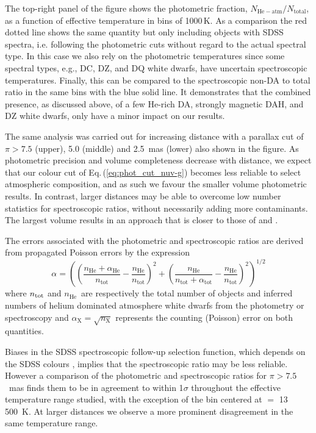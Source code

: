 \documentclass[a4paper,fleqn,usenatbib]{mnras}
\newcommand{\nHe}{$n_{\mathrm{He}}$}
\begin{document}
The top-right panel of the figure shows the photometric fraction, $N_{\mathrm{He-atm}}/N_{\mathrm{total}}$, as a function of effective temperature in bins of 1000\,K. As a comparison the red dotted line shows the same quantity but only including objects with SDSS spectra, i.e. following the photometric cuts without regard to the actual spectral type. In this case we also rely on the photometric temperatures since some spectral types, e.g., DC, DZ, and DQ white dwarfs, have uncertain spectroscopic temperatures. Finally, this can be compared to the spectroscopic non-DA to total ratio in the same bins with the blue solid line. It demonstrates that the combined presence, as discussed above, of a few He-rich DA, strongly magnetic DAH, and DZ white dwarfs, only have a minor impact on our results.

The same analysis was carried out for increasing distance with a parallax cut of $\pi>7.5$ (upper), 5.0 (middle) and 2.5~mas (lower) also shown in the figure. As photometric precision and volume completeness decrease with distance, we expect that our colour cut of Eq.\,(\ref{eq:phot_cut_nuv-g}) becomes less reliable to select atmospheric composition, and as such we favour the smaller volume photometric results. In contrast, larger distances may be able to overcome low number statistics for spectroscopic ratios, without necessarily adding more contaminants. The largest volume results in an approach that is closer to those of \citet{genest-Beaulieu19} and \citet{ourique19}.

The errors associated with the photometric and spectroscopic ratios are derived from propagated Poisson errors by the expression 
\begin{equation}
 \alpha = \left(\left(\frac{n_{\mathrm{He}}+\alpha_{\mathrm{He}}}{n_{\mathrm{tot}}} - \frac{n_{\mathrm{He}}}{n_{\mathrm{tot}}}\right)^2 + \left(\frac{n_{\mathrm{He}}}{n_{\mathrm{tot}}+\alpha_{\mathrm{tot}}} - \frac{n_{\mathrm{He}}}{n_{\mathrm{tot}}}\right)^2\right)^{1/2}
\label{eq:num_err}
\end{equation}
where $n_{\rm tot}$ and \nHe\ are respectively the total number of objects and inferred numbers of helium dominated atmosphere white dwarfs from the photometry or spectroscopy and $\alpha_{\mathrm{X}} = \sqrt{n_{\mathrm{X}}}$ represents the counting (Poisson) error on both quantities. 

Biases in the SDSS spectroscopic follow-up selection function, which depends on the SDSS colours \citep{ngf15}, implies that the spectroscopic ratio may be less reliable. However a comparison of the photometric and spectroscopic ratios for $\pi > 7.5$~mas finds them to be in agreement to within 1$\sigma$ throughout the effective temperature range studied, with the exception of the bin centered at \teff$=$ 13\,500~K. At larger distances we observe a more prominent disagreement in the same temperature range.
\end{document}
